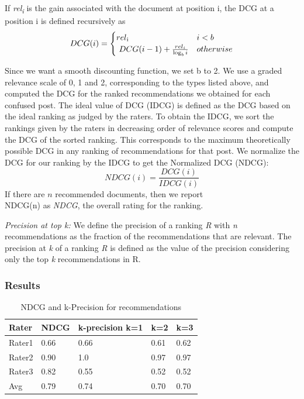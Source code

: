 \documentclass{edm_template}
\begin{document}
If \textit{rel\textsubscript i} is the gain associated with the document at position i, the DCG at a position i is defined recursively as
\begin{equation}
DCG(i) =
\begin{cases}
rel \textsubscript i & i < b  \\
\ DCG(i-1) + \frac{rel_i}{\log_b{i}} & otherwise \\
\end{cases}
\end{equation}

Since we want a smooth discounting function, we set b to 2. We use a graded relevance scale of 0, 1 and 2, corresponding to the types listed above, and computed the DCG for the ranked recommendations we obtained for each confused post. The ideal value of DCG (IDCG) is defined as the DCG based on the ideal ranking as judged by the raters. To obtain the IDCG, we sort the rankings given by the raters in decreasing order of relevance scores and compute the DCG of the sorted ranking. This corresponds to the maximum theoretically possible DCG in any ranking of recommendations for that post. We normalize the DCG for our ranking by the IDCG to get the Normalized DCG (NDCG):
\begin{equation}
NDCG(i) = \frac{DCG(i)}{IDCG(i)}
\end{equation}
If there are $n$ recommended documents, then we report\\NDCG(n) as \emph{NDCG}, the overall rating for the ranking. 

\textit{Precision at top k:}
We define the precision of a ranking \textit{R} with \textit{n} recommendations as the fraction of the recommendations that are relevant. The precision at \textit{k} of a ranking \textit{R} is defined as the value of the precision considering only the top \textit{k} recommendations in R. 
\vspace{-0.3cm}
\subsubsection{Results}
\begin{table}
    \begin{tabular}{|l|l|l|l|l|}
    \hline
    Rater  & NDCG & k-precision k=1 & k=2  & k=3  \\ \hline
    Rater1 & 0.66 & 0.66            & 0.61 & 0.62 \\ \hline
    Rater2 & 0.90 & 1.0             & 0.97 & 0.97 \\ \hline
    Rater3 & 0.82 & 0.55            & 0.52 & 0.52 \\ \hline
    Avg    & 0.79 & 0.74            & 0.70 & 0.70 \\ \hline
    \end{tabular}
    \caption {NDCG and k-Precision for recommendations}
\label{table:ndcg}
\end{table}
\end{document}
